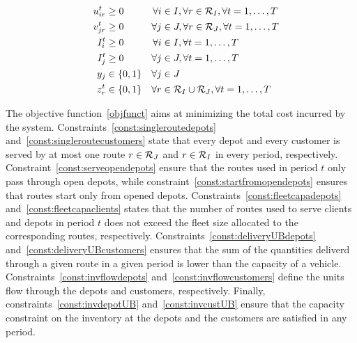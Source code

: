 \documentclass[a4paper,10pt]{article}
\begin{document}
\begin{linenumbers}
\begin{alignat}{3}
                 &&u^t_{ir}			&\geq 0 															&\forall i &\in I, \forall r\in \mathcal{R}_I,\forall t=1,\ldots, T\label{const:upos}	\\
                 &&v^t_{jr}			&\geq 0 															&\forall j &\in J, \forall r\in \mathcal{R}_J,\forall t=1,\ldots, T\label{const:vpos}	\\
                 &&I^t_{i}			&\geq 0 															&\forall i &\in I, \forall t=1,\ldots, T\label{const:invCpos}	\\
                 &&I^t_{j}			&\geq 0 															&\forall j &\in J, \forall t=1,\ldots, T\label{const:invDpos}	\\
                 &&y_{j}					& \in \{0,1\} 														&\forall j&\in J\label{const:ybool}\\	
                 &&z^t_r					&\in \{0,1\} 														&\forall r&\in \mathcal{R}_I\cup\mathcal{R}_J, \forall t=1,\ldots,T\label{const:zbool}
\end{alignat}

The objective function~\eqref{objfunct} aims at minimizing the total cost incurred by the system. 
Constraints~\eqref{const:singleroutedepots} and~\eqref{const:singleroutecustomers} state that every depot and every customer is served by at most one route $r\in\mathcal{R}_J$ and $r\in\mathcal{R}_I$ in every period, respectively. 
Constraint~\eqref{const:serveopendepots} ensure that the routes used in period $t$ only pass through open depots, while constraint~\eqref{const:startfromopendepots} ensures that routes start only from opened depots. 
Constraints~\eqref{const:fleetcapadepots} and~\eqref{const:fleetcapaclients} states that the number of routes used to serve clients and depots in period $t$ does not exceed the fleet size allocated to the corresponding routes, respectively.
Constraints~\eqref{const:deliveryUBdepots} and~\eqref{const:deliveryUBcustomers} ensures that the sum of the quantities deliverd through a given route in a given period is lower than the capacity of a vehicle. 
Constraints~\eqref{const:invflowdepots} and~\eqref{const:invflowcustomers} define the units flow through the depots and customers, respectively.
Finally, constraints~\eqref{const:invdepotUB} and~\eqref{const:invcustUB} ensure that the capacity constraint on the inventory at the depots and the customers are satisfied in any period. 


\end{linenumbers}
\end{document}
